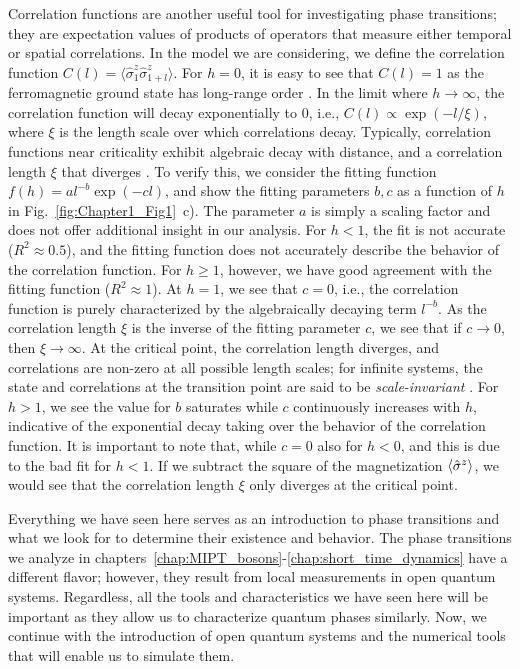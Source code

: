 Correlation functions are another useful tool for investigating phase transitions; they are expectation values of products of operators that measure either temporal or spatial correlations. In the model we are considering, we define the correlation function $C(l) = \langle \hat{\sigma}^z_1 \hat{\sigma}^z_{1+l} \rangle$. For $h = 0$, it is easy to see that $C(l) = 1$ as the ferromagnetic ground state has long-range order \cite{carlin1986}. In the limit where $h \to \infty$, the correlation function will decay exponentially to $0$, i.e., $C(l) \propto \exp(- l/\xi)$, where $\xi$ is the length scale over which correlations decay. Typically, correlation functions near criticality exhibit algebraic decay with distance, and a correlation length $\xi$ that diverges \cite{carr2010}. To verify this, we consider the fitting function $f(h) = a l^{-b} \exp(-c l)$, and show the fitting parameters $b, c$ as a function of $h$ in Fig.~\ref{fig:Chapter1_Fig1}~c). The parameter $a$ is simply a scaling factor and does not offer additional insight in our analysis. For $h < 1$, the fit is not accurate ($R^2 \approx 0.5$), and the fitting function does not accurately describe the behavior of the correlation function. For $h \geq 1$, however, we have good agreement with the fitting function ($R^2 \approx 1$). At $h = 1$, we see that $c = 0$, i.e., the correlation function is purely characterized by the algebraically decaying term $l^{-b}$. As the correlation length $\xi$ is the inverse of the fitting parameter $c$, we see that if $c \to 0$, then $\xi \to \infty$. At the critical point, the correlation length diverges, and correlations are non-zero at all possible length scales; for infinite systems, the state and correlations at the transition point are said to be \textit{scale-invariant} \cite{carr2010, sachdev2011}. For $h > 1$, we see the value for $b$ saturates while $c$ continuously increases with $h$, indicative of the exponential decay taking over the behavior of the correlation function. It is important to note that, while $c=0$ also for $h<0$, and this is due to the bad fit for $h<1$. If we subtract the square of the magnetization $\expval{\hat\sigma^z}$, we would see that the correlation length $\xi$ only diverges at the critical point.

Everything we have seen here serves as an introduction to phase transitions and what we look for to determine their existence and behavior. The phase transitions we analyze in chapters~\ref{chap:MIPT_bosons}-\ref{chap:short_time_dynamics} have a different flavor; however, they result from local measurements in open quantum systems. Regardless, all the tools and characteristics we have seen here will be important as they allow us to characterize quantum phases similarly. Now, we continue with the introduction of open quantum systems and the numerical tools that will enable us to simulate them.